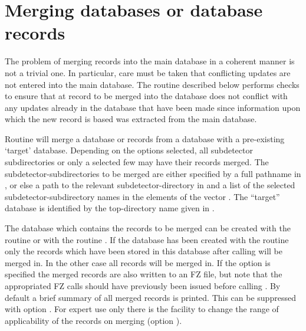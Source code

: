 \section{Merging databases or database records}

The problem of merging records into the main database in a
coherent manner is not a trivial one. In particular, care
must be taken that conflicting updates are not entered into
the main database. The routine  described below
performs checks to ensure that at record to be merged into
the database does not conflict with any updates already
in the database that have been made since information
upon which the new record is based was extracted from the
main database.
\par
Routine  will merge a database or records from a database with a
pre-existing `target' database. Depending on the options selected,
all subdetector subdirectories or only a selected few may have their
records merged. The subdetector-subdirectories to be merged are either
specified by a full pathname in , or else a path to the
relevant subdetector-directory in  and a list of the selected
subdetector-subdirectory names in the  elements of the 
vector . The ``target'' database is
identified by the top-directory name given in  .

The database which contains the records to be merged can be created
with the  routine or with the routine . If the
database has been created with the  routine only the records which
have been stored in this database after calling  will be merged
in. In the other case all records will be merged in. If the option 
is specified the merged records are also written to an FZ file, but note
that the appropriated FZ calls should have previously been issued before
calling .
By default a brief summary of all merged records is printed. This
can be suppressed with option . For expert use only there is the
facility to change the range of applicability of the records on merging
(option ).


